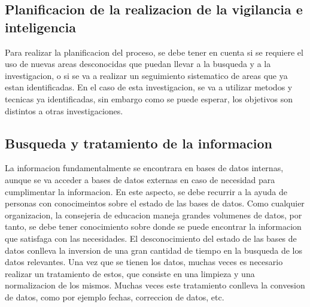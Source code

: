 \documentclass[spanish,12pt, a4paper,twoside]{paper}
\begin{document}
\subsection{Planificacion de la realizacion de la vigilancia e inteligencia}
Para realizar la planificacion del proceso, se debe tener en cuenta si se requiere el uso de nuevas areas desconocidas que puedan llevar a la busqueda y a la investigacion, o si se va a realizar un seguimiento sistematico de areas que ya estan identificadas. En el caso de esta investigacion, se va a utilizar metodos y tecnicas ya identificadas, sin embargo como se puede esperar, los objetivos son distintos a otras investigaciones.


\subsection{Busqueda y tratamiento de la informacion}
\justify
La informacion fundamentalmente se encontrara en bases de datos internas, aunque se va acceder a bases de datos externas en caso de necesidad para cumplimentar la informacion. En este aspecto, se debe recurrir a la ayuda de personas con conocimeintos sobre el estado de las bases de datos. Como cualquier organizacion, la consejeria de educacion maneja grandes volumenes de datos, por tanto, se debe tener conocimiento sobre donde se puede encontrar la informacion que satisfaga con las necesidades. 
El desconocimiento del estado de las bases de datos conlleva la inversion de una gran cantidad de tiempo en la busqueda de los datos relevantes. 
\justify
Una vez que se tienen los datos, muchas veces es necesario realizar un tratamiento de estos, que consiste en una limpieza y una normalizacion de los mismos. Muchas veces este tratamiento conlleva la convesion de datos, como por ejemplo fechas, correccion de datos, etc.
\end{document}
